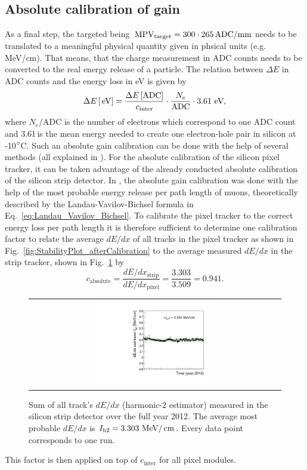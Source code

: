 \subsection*{Absolute calibration of gain}
As a final step, the targeted \mpv being $\,\text{MPV}_{\text{target}}=300 \cdot 265 \,  \text{ADC/mm}$ needs to be translated to a meaningful physical quantity given in phsical units (e.g. MeV/cm).
That means, that the charge measurement in ADC counts needs to be converted to the real energy release of a particle.
The relation between $\Delta E$ in ADC counts and the energy loss in eV is given by
\begin{equation*}
\Delta E\,[\,\text{e}\kern-0.06667em\text{V}] = \frac{\Delta E\,[\text{ADC}]}{c_{\text{inter}}} \cdot \frac{N_e}{\text{ADC}} \cdot 3.61 \, \,\text{e}\kern-0.06667em\text{V},
\end{equation*}
where $N_e$/ADC is the number of electrons which correspond to one ADC count and 3.61\,\ev is the  mean energy needed to create one electron-hole pair in silicon at -10$\degree$C.
Such an absolute gain calibration can be done with the help of several methods (all explained in \cite{bib:Quertenmont_2010}).
For the absolute calibration of the silicon pixel tracker, it can be taken advantage of the already conducted absolute calibration of the silicon strip detector.
In \cite{bib:Quertenmont_2010}, the absolute gain calibration was done with the help of the most probable energy release per path length of muons, 
theoretically described by the Landau-Vavilov-Bichsel formula in Eq.~\ref{eq:Landau_Vavilov_Bichsel}.  
To calibrate the pixel tracker to the correct energy loss per path length it is therefore sufficient to determine one calibration factor to relate the average $dE/dx$ of all tracks in the pixel tracker as shown in 
Fig.~\ref{fig:StabilityPlot_afterCalibration} to the average measured $dE/dx$ in the strip tracker, shown in Fig.~\ref{fig:StabilityPlot_Strip} by
\begin{equation*}
c_{\text{absolute}} = \frac{dE/dx_{\text{strip}}}{dE/dx_{\text{pixel}}} = \frac{3.303}{3.509} = 0.941.
\end{equation*}
\begin{figure}[!bt]
  \centering 
  \begin{tabular}{c}
  \includegraphics[width=0.49\textwidth]{figures/analysis/StabilityPlot_Strip_afterCalibration_withoutStepFits_NEW.pdf}
  \end{tabular}
  \caption{Sum of all track's $dE/dx$ (harmonic-2 estimator) measured in the silicon strip detector over the full year 2012. The average most probable $dE/dx$ is $I_{\text{h2}}=3.303\,\,\text{Me}\kern-0.06667em\text{V}/\,\text{cm}$. Every data point corresponds to one run.} 
  \label{fig:StabilityPlot_Strip}
\end{figure}
This factor is then applied on top of $c_{\text{inter}}$ for all pixel modules.

